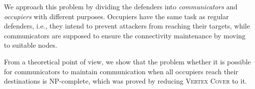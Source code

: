 We approach this problem by dividing the defenders into \emph{communicators} and \emph{occupiers} with different purposes. 
Occupiers have the same task as regular defenders, i.e., they intend to prevent attackers from reaching their targets, 
while communicators are supposed to ensure the connectivity maintenance by moving to suitable nodes.

From a theoretical point of view, we show that the problem whether it is possible for communicators to maintain communication when all occupiers reach their destinations is NP-complete, 
which was proved by reducing \textsc{Vertex Cover} to it.
